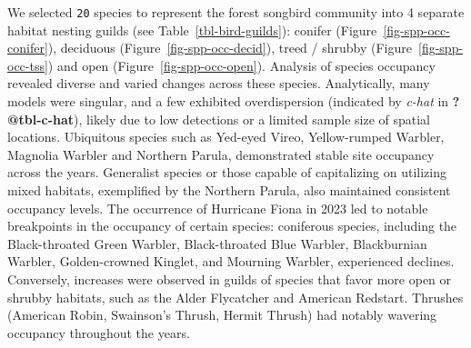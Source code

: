 \documentclass[
  letterpaper,
  DIV=11,
  numbers=noendperiod,
  oneside]{scrartcl}
\begin{document}
We selected \texttt{20} species to represent the forest songbird
community into 4 separate habitat nesting guilds (see
Table~\ref{tbl-bird-guilds}): conifer
(Figure~\ref{fig-spp-occ-conifer}), deciduous
(Figure~\ref{fig-spp-occ-decid}), treed / shrubby
(Figure~\ref{fig-spp-occ-tss}) and open (Figure~\ref{fig-spp-occ-open}).
Analysis of species occupancy revealed diverse and varied changes across
these species. Analytically, many models were singular, and a few
exhibited overdispersion (indicated by \emph{c-hat} in
\textbf{?@tbl-c-hat}), likely due to low detections or a limited sample
size of spatial locations. Ubiquitous species such as Yed-eyed Vireo,
Yellow-rumped Warbler, Magnolia Warbler and Northern Parula,
demonstrated stable site occupancy across the years. Generalist species
or those capable of capitalizing on utilizing mixed habitats,
exemplified by the Northern Parula, also maintained consistent occupancy
levels. The occurrence of Hurricane Fiona in 2023 led to notable
breakpoints in the occupancy of certain species: coniferous species,
including the Black-throated Green Warbler, Black-throated Blue Warbler,
Blackburnian Warbler, Golden-crowned Kinglet, and Mourning Warbler,
experienced declines. Conversely, increases were observed in guilds of
species that favor more open or shrubby habitats, such as the Alder
Flycatcher and American Redstart. Thrushes (American Robin, Swainson's
Thrush, Hermit Thrush) had notably wavering occupancy throughout the
years.
\end{document}
